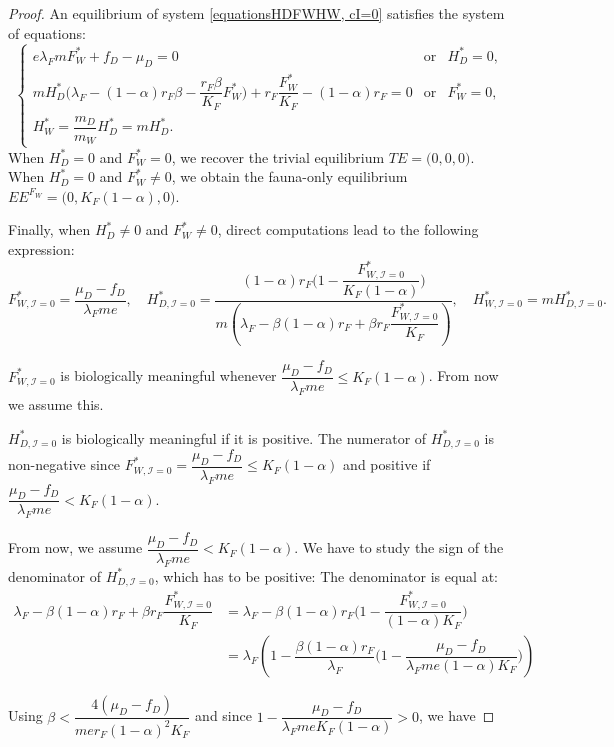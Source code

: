 \documentclass{article}
\newcommand{\lfw}{\lambda_{F}}
\newcommand{\lfw}{\lambda_{F}}
\newcommand{\cI}{\mathcal{I}}
\begin{document}
\begin{proof}
An equilibrium of system \eqref{equationsHDFWHW, cI=0} satisfies the system of equations:
\begin{equation}\label{system-equilibre, cI=0}
\left\lbrace \begin{array}{cll}
 e \lfw m F_W^* + f_D - \mu_D = 0& \mbox{or} & H_D^* = 0,\\
m H_D^*\Big(\lfw - (1-\alpha)r_F \beta - \dfrac{r_F \beta}{K_F}F_W^* \Big) + r_F \dfrac{F_W^*}{K_F} - (1-\alpha)r_F= 0& \mbox{or} & F^*_W = 0,\\
H_W^* = \dfrac{m_D}{m_W} H_D^* = m H_D^*.&&
\end{array} \right.
\end{equation}
When $H_D^*=0$ and $F_W^*=0$, we recover the trivial equilibrium $TE = \Big(0,0,0\Big)$. When $H_D^*=0$ and $F_W^*\neq0$, we obtain the fauna-only equilibrium $EE^{F_W} = \Big(0, K_F(1-\alpha), 0 \Big)$. 

Finally, when $H_D^*\neq0$ and $F_W^*\neq0$, direct computations lead to the following expression:
$$F^*_{W, \cI = 0} = \dfrac{\mu_D - f_D}{\lfw m e}, \quad
H^*_{D, \cI = 0} = \dfrac{(1-\alpha)r_F\Big(1 - \dfrac{F^*_{W, \cI = 0}}{K_F(1-\alpha)} \Big)}{m\left(\lfw - \beta (1-\alpha) r_F + \beta r_F  \dfrac{F^*_{W, \cI = 0}}{K_F}\right)} ,
\quad 
H^*_{W, \cI = 0} = m H^*_{D, \cI = 0}.$$


$F^*_{W, \cI = 0}$ is biologically meaningful whenever $\dfrac{\mu_D - f_D}{\lfw m e} \leq K_F(1-\alpha)$. From now we assume this.

$H^*_{D, \cI = 0}$ is biologically meaningful if it is positive. The numerator of $H^*_{D, \cI = 0}$ is non-negative since $F^*_{W, \cI = 0} = \dfrac{\mu_D - f_D}{\lfw m e} \leq K_F(1-\alpha)$ and positive if $\dfrac{\mu_D - f_D}{\lfw m e} < K_F(1-\alpha)$. 

From now, we assume $\dfrac{\mu_D - f_D}{\lfw m e} < K_F(1-\alpha)$.
We have to study the sign of the denominator of $H^*_{D, \cI = 0}$, which has to be positive:
The denominator is equal at:
\begin{align}
\lfw - \beta (1-\alpha) r_F + \beta r_F  \dfrac{F^*_{W, \cI = 0}}{K_F} &= \lfw - \beta (1-\alpha) r_F \Big(1 - \dfrac{F^*_{W, \cI = 0}}{(1-\alpha)K_F} \Big) \\
&= \lfw \left(1 - \dfrac{\beta (1-\alpha) r_F}{\lfw} \Big(1 - \dfrac{\mu_D - f_D}{\lfw m e(1-\alpha)K_F} \Big) \right) \label{denominator}
\end{align}

Using $\beta < \dfrac{4 (\mu_D - f_D)}{m e r_F (1-\alpha)^2 K_F}$ and since $1 - \dfrac{\mu_D - f_D}{\lfw m eK_F(1-\alpha)} > 0$, we have


\end{proof}
\end{document}
